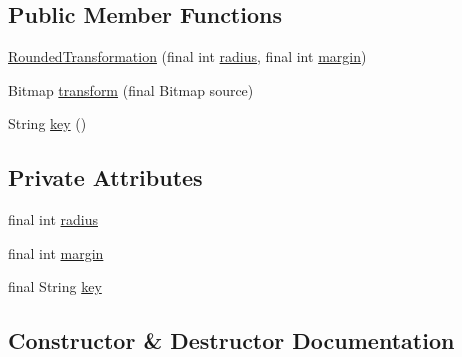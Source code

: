 \subsection*{Public Member Functions}
\begin{DoxyCompactItemize}
\item 
\hyperlink{classorg_1_1buildmlearn_1_1toolkit_1_1utilities_1_1RoundedTransformation_a230d72e465a44c2b8def417719724ac5}{Rounded\+Transformation} (final int \hyperlink{classorg_1_1buildmlearn_1_1toolkit_1_1utilities_1_1RoundedTransformation_a6846ad52d24b8fcc6c4753a39399f6c6}{radius}, final int \hyperlink{classorg_1_1buildmlearn_1_1toolkit_1_1utilities_1_1RoundedTransformation_ad63dc90e2c801828a6548d357fd10064}{margin})
\item 
Bitmap \hyperlink{classorg_1_1buildmlearn_1_1toolkit_1_1utilities_1_1RoundedTransformation_ad9bbdf5e91517e1a932c7c2b30ba4b84}{transform} (final Bitmap source)
\item 
String \hyperlink{classorg_1_1buildmlearn_1_1toolkit_1_1utilities_1_1RoundedTransformation_ad973ae030ca1f47651741eaa4791c64a}{key} ()
\end{DoxyCompactItemize}
\subsection*{Private Attributes}
\begin{DoxyCompactItemize}
\item 
final int \hyperlink{classorg_1_1buildmlearn_1_1toolkit_1_1utilities_1_1RoundedTransformation_a6846ad52d24b8fcc6c4753a39399f6c6}{radius}
\item 
final int \hyperlink{classorg_1_1buildmlearn_1_1toolkit_1_1utilities_1_1RoundedTransformation_ad63dc90e2c801828a6548d357fd10064}{margin}
\item 
final String \hyperlink{classorg_1_1buildmlearn_1_1toolkit_1_1utilities_1_1RoundedTransformation_a480a5ed67bf772012260ab87ca1fed22}{key}
\end{DoxyCompactItemize}


\subsection{Constructor \& Destructor Documentation}
